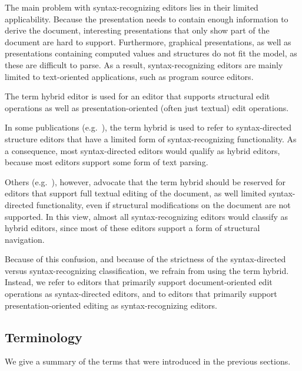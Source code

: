 The main problem with syntax-recognizing editors lies in their limited applicability. Because the presentation needs to contain enough information to derive the document, interesting presentations that only show part of the document are hard to support. Furthermore, graphical presentations, as well as presentations containing computed values and structures do not fit the model, as these are difficult to parse. As a result, syntax-recognizing editors are mainly limited to text-oriented applications, such as program source editors.


The term hybrid editor is used for an editor that supports structural edit operations as well as presentation-oriented (often just textual) edit operations.

In some publications (e.g.~\cite{teitelbaum81progSynth, minor90editing}), the term hybrid is used to refer to syntax-directed structure editors that have a limited form of syntax-recognizing functionality. As a consequence, most syntax-directed editors would qualify as hybrid editors, because most editors support some form of text parsing.

Others (e.g.~\cite{ballance92pan, koorn92gse}), however, advocate that the term hybrid should be reserved for editors that support full textual editing of the document, as well limited syntax-directed functionality, even if structural modifications on the document are not supported. In this view, almost all syntax-recognizing editors would classify as hybrid editors, since most of these editors support a form of structural navigation.

Because of this confusion, and because of the strictness of the syntax-directed versus syntax-recognizing classification, we refrain from using the term hybrid. Instead, we refer to editors that primarily support document-oriented edit operations as syntax-directed editors, and to editors that primarily support presentation-oriented editing as syntax-recognizing editors.

\subsection{Terminology}

We give a summary of the terms that were introduced in the previous sections.


